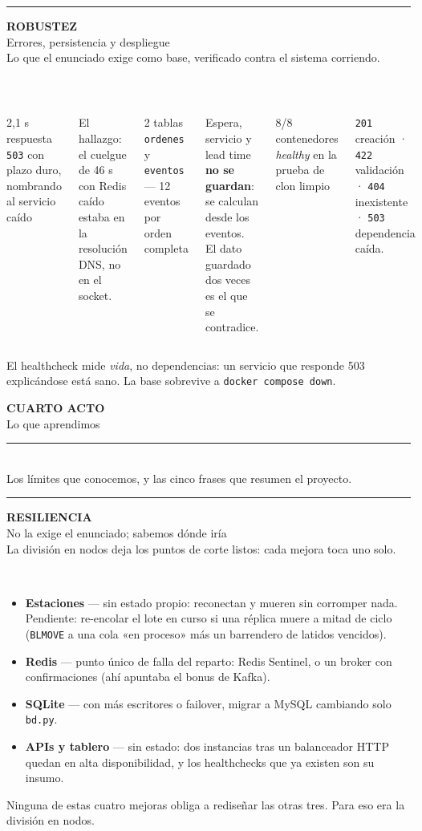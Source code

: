\documentclass[aspectratio=169,10pt]{beamer}
\newcommand{\ligera}{\sffamily}
\newcommand{\antetitulo}{\sffamily\bfseries}
\newcommand{\actoactual}{}
\newcommand{\lamina}[3]{%
  \vspace{0.05cm}%
  \noindent\textcolor{tealu}{\rule[-0.92cm]{2.6pt}{1.32cm}}\hspace{0.32cm}%
  \begin{minipage}[t]{0.92\linewidth}
    {\antetitulo\scriptsize\color{tealu}\MakeUppercase{#1}}\\[4pt]
    {\ligera\fontsize{19}{22}\selectfont\color{tinta}#2}\\[4pt]
    {\footnotesize\color{tinta2}#3}
  \end{minipage}\\[0.5cm]}
\newcommand{\acto}[3]{%
  {\setbeamercolor{background canvas}{bg=tinta}
   \begin{frame}[plain]
   \vfill
   \hspace{1.5cm}\begin{minipage}{0.82\linewidth}
     {\antetitulo\scriptsize\color{tealu}\MakeUppercase{#1}}\\[12pt]
     {\ligera\fontsize{30}{34}\selectfont\color{white}#2}\\[14pt]
     {\color{tealu}\rule{2.6cm}{1.8pt}}\\[12pt]
     {\small\color{grilla}#3}
   \end{minipage}
   \vfill
   \end{frame}}}
\newcommand{\clave}[1]{%
  \vspace{0.15cm}%
  \noindent\raisebox{-0.22cm}{\textcolor{tealu}{\rule{2.6pt}{0.66cm}}}\hspace{0.3cm}%
  \begin{minipage}[c]{0.93\linewidth}{\footnotesize\color{tinta}#1}\end{minipage}}
\newcommand{\cifra}[2]{%
  \begin{center}{\cifrafont\fontsize{30}{32}\selectfont\color{tealu}#1}\\[3pt]
  {\scriptsize\color{tinta2}#2}\end{center}}
\begin{document}
\begin{frame}[fragile]
\lamina{Robustez}{Errores, persistencia y despliegue}
       {Lo que el enunciado exige como base, verificado contra el sistema corriendo.}
\begin{columns}[T]
\cifra{2,1 s}{respuesta \texttt{503} con plazo duro, nombrando al servicio caído}
{\scriptsize\color{tinta2}El hallazgo: el cuelgue de 46 s con Redis caído estaba en la resolución DNS, no en el socket.}
\cifra{2 tablas}{\texttt{ordenes} y \texttt{eventos} — 12 eventos por orden completa}
{\scriptsize\color{tinta2}Espera, servicio y lead time \textbf{no se guardan}: se calculan desde los eventos. El dato guardado dos veces es el que se contradice.}
\cifra{8/8}{contenedores \emph{healthy} en la prueba de clon limpio}
{\scriptsize\color{tinta2}\texttt{201} creación · \texttt{422} validación · \texttt{404} inexistente · \texttt{503} dependencia caída.}
\end{columns}
\clave{El healthcheck mide \emph{vida}, no dependencias: un servicio que responde 503 explicándose está sano. La base sobrevive a \texttt{docker compose down}.}
\end{frame}

\renewcommand{\actoactual}{IV · Lo que aprendimos}
\acto{Cuarto acto}{Lo que aprendimos}
     {Los límites que conocemos, y las cinco frases que resumen el proyecto.}

\begin{frame}[fragile]
\lamina{Resiliencia}{No la exige el enunciado; sabemos dónde iría}
       {La división en nodos deja los puntos de corte listos: cada mejora toca uno solo.}
\begin{itemize}
  \item \textbf{Estaciones} — sin estado propio: reconectan y mueren sin corromper nada. Pendiente: re-encolar el lote en curso si una réplica muere a mitad de ciclo (\texttt{BLMOVE} a una cola «en proceso» más un barrendero de latidos vencidos).
  \item \textbf{Redis} — punto único de falla del reparto: Redis Sentinel, o un broker con confirmaciones (ahí apuntaba el bonus de Kafka).
  \item \textbf{SQLite} — con más escritores o failover, migrar a MySQL cambiando solo \texttt{bd.py}.
  \item \textbf{APIs y tablero} — sin estado: dos instancias tras un balanceador HTTP quedan en alta disponibilidad, y los healthchecks que ya existen son su insumo.
\end{itemize}
\clave{Ninguna de estas cuatro mejoras obliga a rediseñar las otras tres. Para eso era la división en nodos.}
\end{frame}
\end{document}

